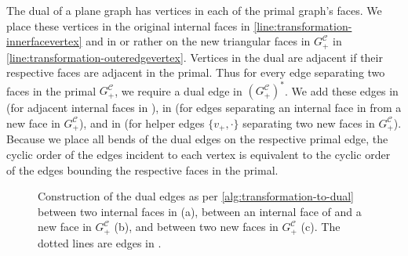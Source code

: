 The dual of a plane graph has vertices in each of the primal graph's faces.
We place these vertices in the original internal faces in \cref{line:transformation-innerfacevertex} and in \emdash{} or rather on \emdash{} the new triangular faces in $G_+^\mathcal{C}$ in \cref{line:transformation-outeredgevertex}.
Vertices in the dual are adjacent if their respective faces are adjacent in the primal.
Thus for every edge separating two faces in the primal $G_+^\mathcal{C}$, we require a dual edge in $(G_+^\mathcal{C})^*$.
We add these edges in  (for adjacent internal faces in \clustergraph{}), in  (for edges separating an internal face in \clustergraph{} from a new face in $G_+^\mathcal{C}$), and in  (for helper edges $\{v_+,\cdot\}$ separating two new faces in $G_+^\mathcal{C}$).
Because we place all bends of the dual edges on the respective primal edge, the cyclic order of the edges incident to each vertex is equivalent to the cyclic order of the edges bounding the respective faces in the primal.



\begin{figure}[H]
	\centering
	\quad
	\caption{Construction of the dual edges as per \cref{alg:transformation-to-dual} between two internal faces in \clustergraph{} (a), between an internal face of \clustergraph{} and a new face in $G_+^\mathcal{C}$ (b), and between two new faces in $G_+^\mathcal{C}$ (c). The dotted lines are edges in \clustergraph{}.}
	\label{fig:transformation-dual-edge-construction}
\end{figure}

